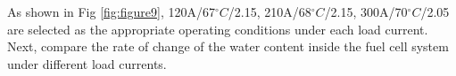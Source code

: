 As shown in Fig \ref{fig:figure9}, 120A/67$^{\circ}C$/2.15, 210A/68$^{\circ}C$/2.15, 300A/70$^{\circ}C$/2.05 are selected as the appropriate operating conditions under each load current.
Next, compare the rate of change of the water content inside the fuel cell system under different load currents.

